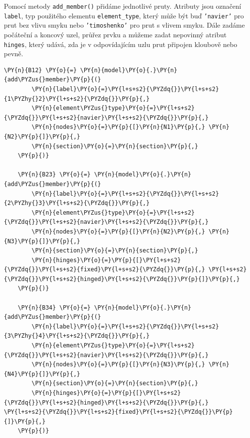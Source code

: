 Pomocí metody \texttt{add\_member()} přidáme jednotlivé pruty. Atributy jsou označení \texttt{label}, typ použitého elementu \texttt{element\_type}, který může být buď \texttt{'navier'} pro prut bez vlivu smyku nebo \texttt{'timoshenko'} pro prut s vlivem smyku. Dále zadáme počáteční a koncový uzel, průřez prvku a můžeme zadat nepovinný atribut \texttt{hinges}, který udává, zda je v odpovídajícím uzlu prut připojen kloubově nebo pevně.
\begin{tcolorbox}[breakable, size=fbox, boxrule=1pt, pad at break*=1mm,colback=cellbackground, colframe=cellborder]
    \begin{Verbatim}[commandchars=\\\{\}]
    \PY{n}{B12} \PY{o}{=} \PY{n}{model}\PY{o}{.}\PY{n}{add\PYZus{}member}\PY{p}{(}
        \PY{n}{label}\PY{o}{=}\PY{l+s+s2}{\PYZdq{}}\PY{l+s+s2}{1\PYZhy{}2}\PY{l+s+s2}{\PYZdq{}}\PY{p}{,}
        \PY{n}{element\PYZus{}type}\PY{o}{=}\PY{l+s+s2}{\PYZdq{}}\PY{l+s+s2}{navier}\PY{l+s+s2}{\PYZdq{}}\PY{p}{,}
        \PY{n}{nodes}\PY{o}{=}\PY{p}{[}\PY{n}{N1}\PY{p}{,} \PY{n}{N2}\PY{p}{]}\PY{p}{,}
        \PY{n}{section}\PY{o}{=}\PY{n}{section}\PY{p}{,}
    \PY{p}{)}
    
    \PY{n}{B23} \PY{o}{=} \PY{n}{model}\PY{o}{.}\PY{n}{add\PYZus{}member}\PY{p}{(}
        \PY{n}{label}\PY{o}{=}\PY{l+s+s2}{\PYZdq{}}\PY{l+s+s2}{2\PYZhy{}3}\PY{l+s+s2}{\PYZdq{}}\PY{p}{,}
        \PY{n}{element\PYZus{}type}\PY{o}{=}\PY{l+s+s2}{\PYZdq{}}\PY{l+s+s2}{navier}\PY{l+s+s2}{\PYZdq{}}\PY{p}{,}
        \PY{n}{nodes}\PY{o}{=}\PY{p}{[}\PY{n}{N2}\PY{p}{,} \PY{n}{N3}\PY{p}{]}\PY{p}{,}
        \PY{n}{section}\PY{o}{=}\PY{n}{section}\PY{p}{,}
        \PY{n}{hinges}\PY{o}{=}\PY{p}{[}\PY{l+s+s2}{\PYZdq{}}\PY{l+s+s2}{fixed}\PY{l+s+s2}{\PYZdq{}}\PY{p}{,} \PY{l+s+s2}{\PYZdq{}}\PY{l+s+s2}{hinged}\PY{l+s+s2}{\PYZdq{}}\PY{p}{]}\PY{p}{,}
    \PY{p}{)}
    
    \PY{n}{B34} \PY{o}{=} \PY{n}{model}\PY{o}{.}\PY{n}{add\PYZus{}member}\PY{p}{(}
        \PY{n}{label}\PY{o}{=}\PY{l+s+s2}{\PYZdq{}}\PY{l+s+s2}{3\PYZhy{}4}\PY{l+s+s2}{\PYZdq{}}\PY{p}{,}
        \PY{n}{element\PYZus{}type}\PY{o}{=}\PY{l+s+s2}{\PYZdq{}}\PY{l+s+s2}{navier}\PY{l+s+s2}{\PYZdq{}}\PY{p}{,}
        \PY{n}{nodes}\PY{o}{=}\PY{p}{[}\PY{n}{N3}\PY{p}{,} \PY{n}{N4}\PY{p}{]}\PY{p}{,}
        \PY{n}{section}\PY{o}{=}\PY{n}{section}\PY{p}{,}
        \PY{n}{hinges}\PY{o}{=}\PY{p}{[}\PY{l+s+s2}{\PYZdq{}}\PY{l+s+s2}{hinged}\PY{l+s+s2}{\PYZdq{}}\PY{p}{,} \PY{l+s+s2}{\PYZdq{}}\PY{l+s+s2}{fixed}\PY{l+s+s2}{\PYZdq{}}\PY{p}{]}\PY{p}{,}
    \PY{p}{)}
    

\end{Verbatim}
\end{tcolorbox}
